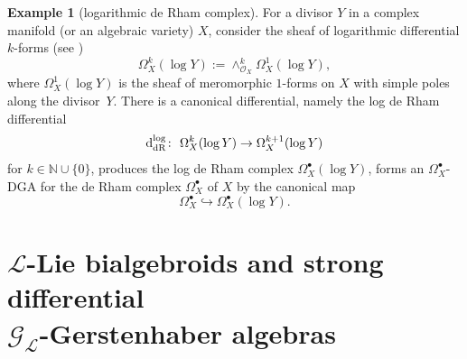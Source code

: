 \documentclass[pdftex]{sigma}
\numberwithin{equation}{section}
\theoremstyle{definition}
\newtheorem{Exm}[Thm]{Example}
\begin{document}
 \begin{Exm}[logarithmic de Rham complex]
	For a divisor $Y$ in a complex manifold (or an algebraic variety) $X$, consider the sheaf of logarithmic differential $k$-forms (see \cite{CMD, PT})
\[
\Omega^k_X(\log Y):=\wedge^k_{\mathcal{O}_X}\Omega^1_X(\log Y),
\]
where $\Omega^1_X(\log Y)$ is the sheaf of meromorphic $1$-forms on $X$ with simple poles along the divisor~$Y$. There is a canonical differential, namely the log de Rham differential
	\begin{align} \label{log de Rham diff}
		{\rm d}^{\log}_{\rm dR}\colon \ \Omega^k_X(\log Y) \rightarrow \Omega^{k+1}_X(\log Y)
	\end{align}
	for $k \in \mathbb{N} \cup \{0\}$, produces the log de Rham complex
	$\Omega^{\bullet}_X(\log Y)$, forms an $\Omega^{\bullet}_X$-DGA for the de Rham complex $\Omega^{\bullet}_X$ of $X$ by the canonical map
\[
\Omega^{\bullet}_X \hookrightarrow \Omega^{\bullet}_X(\log Y).
\]
\end{Exm}

\section[L-Lie bialgebroids and strong differential G\_L-Gerstenhaber algebras]{$\boldsymbol{\mathcal{L}}$-Lie bialgebroids and strong differential\\ $\boldsymbol{\mathcal{G}_{\mathcal{L}}}$-Gerstenhaber algebras} \label{Sec 5}
\end{document}
